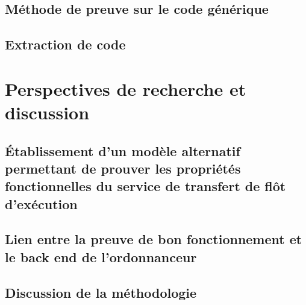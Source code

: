 		\subsection{Méthode de preuve sur le code générique}

		\subsection{Extraction de code}


	\section{Perspectives de recherche et discussion}
		\subsection{Établissement d'un modèle alternatif permettant de prouver les propriétés fonctionnelles du service de transfert de flôt d'exécution}
		\subsection{Lien entre la preuve de bon fonctionnement et le back end de l'ordonnanceur}
		\subsection{Discussion de la méthodologie}
